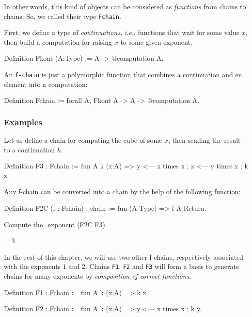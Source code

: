 In other words, this kind of objects can be considered as \emph{functions}
from chains to chains. So, we called their type \texttt{Fchain}.



First, we define a type of \emph{continuations},
\emph{i.e.},  functions  that wait for some value $x$, then 
build  a computation for raising {$x$} to some  given exponent.

\begin{Coqsrc}
Definition Fkont (A:Type) := A -> @computation A.
\end{Coqsrc}

An \texttt{f-chain} is just a polymorphic function that combines  a 
continuation and en element into a computation:

\begin{Coqsrc}
Definition Fchain := forall A, Fkont A -> A -> @computation A.
\end{Coqsrc}


\subsubsection{Examples}

Let us define a chain for computing the cube of some $x$, then sending 
the result to a continuation $k$.

\begin{Coqsrc}
Definition F3 : Fchain := 
 fun  A k  (x:A) =>
  y <--- x times x ;
  z <--- y times x ;
  k  z.
\end{Coqsrc}


Any f-chain can be converted into a chain by the help of the following function:

\begin{Coqsrc}
Definition F2C (f : Fchain) : chain :=
 fun (A:Type) => f A Return.

Compute the_exponent (F2C F3).
\end{Coqsrc}

\begin{Coqanswer}
= 3%
\end{Coqanswer}


In the rest of this chapter, we will use two other f-chains, respectively associated with the exponents $1$ and $2$. Chains \texttt{F1}, \texttt{F2} and
\texttt{F3} will form a basis to generate  chains for many exponents
by \emph{composition of correct functions}.

\begin{Coqsrc}
Definition F1 : Fchain := 
 fun A k (x:A) => k x.

Definition F2 : Fchain := 
fun  A k  (x:A) =>
  y <--- x times x ;
  k  y.
\end{Coqsrc}


